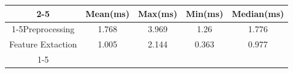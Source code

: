 \documentclass{standalone}
\begin{document}
 
 \begin{tabular}{|c |c |c |c |c |}
\cline{2-5}\cline{2-5} \multicolumn{1}{c |}{ } & Mean(ms) & Max(ms) & Min(ms) & Median(ms)\\ 
\cline{1-5}Preprocessing & 1.768 & 3.969 & 1.26 & 1.776\\ 
 \hhline{|=|=|=|=|=|}Feature Extaction & 1.005 & 2.144 & 0.363 & 0.977\\ 
 \cline{1-5}\hline \end{tabular}
 
\end{document}
